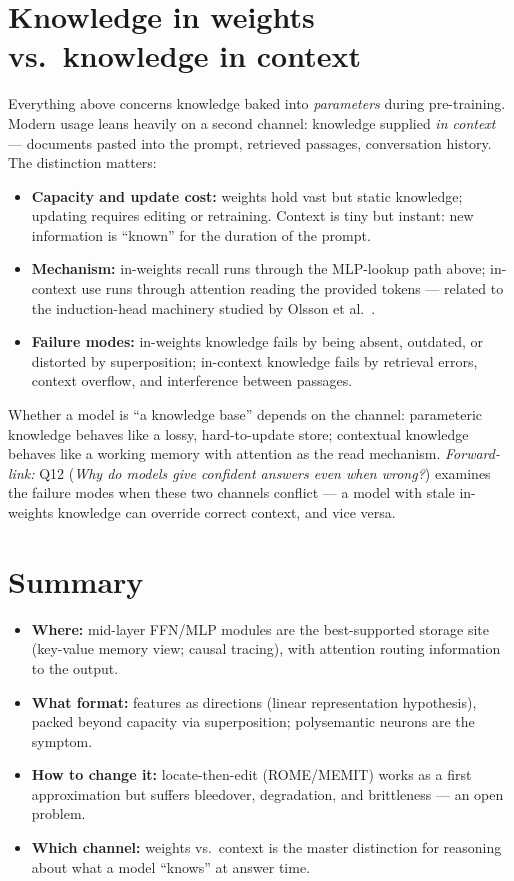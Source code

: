 \documentclass[11pt]{article}
\begin{document}
\section{Knowledge in weights vs.\ knowledge in context}
Everything above concerns knowledge baked into \emph{parameters} during pre-training. Modern usage leans heavily on a second channel: knowledge supplied \emph{in context} --- documents pasted into the prompt, retrieved passages, conversation history. The distinction matters:
\begin{itemize}[noitemsep]
  \item \textbf{Capacity and update cost:} weights hold vast but static knowledge; updating requires editing or retraining. Context is tiny but instant: new information is ``known'' for the duration of the prompt.
  \item \textbf{Mechanism:} in-weights recall runs through the MLP-lookup path above; in-context use runs through attention reading the provided tokens --- related to the induction-head machinery studied by Olsson et al.\ \cite{olsson2022context}.
  \item \textbf{Failure modes:} in-weights knowledge fails by being absent, outdated, or distorted by superposition; in-context knowledge fails by retrieval errors, context overflow, and interference between passages.
\end{itemize}
Whether a model is ``a knowledge base'' \cite{petroni2019language} depends on the channel: parameteric knowledge behaves like a lossy, hard-to-update store; contextual knowledge behaves like a working memory with attention as the read mechanism. \emph{Forward-link:} Q12 (\emph{Why do models give confident answers even when wrong?}) examines the failure modes when these two channels conflict --- a model with stale in-weights knowledge can override correct context, and vice versa.

\section{Summary}
\begin{itemize}[noitemsep]
  \item \textbf{Where:} mid-layer FFN/MLP modules are the best-supported storage site (key-value memory view; causal tracing), with attention routing information to the output.
  \item \textbf{What format:} features as directions (linear representation hypothesis), packed beyond capacity via superposition; polysemantic neurons are the symptom.
  \item \textbf{How to change it:} locate-then-edit (ROME/MEMIT) works as a first approximation but suffers bleedover, degradation, and brittleness --- an open problem.
  \item \textbf{Which channel:} weights vs.\ context is the master distinction for reasoning about what a model ``knows'' at answer time.
\end{itemize}



\end{document}
